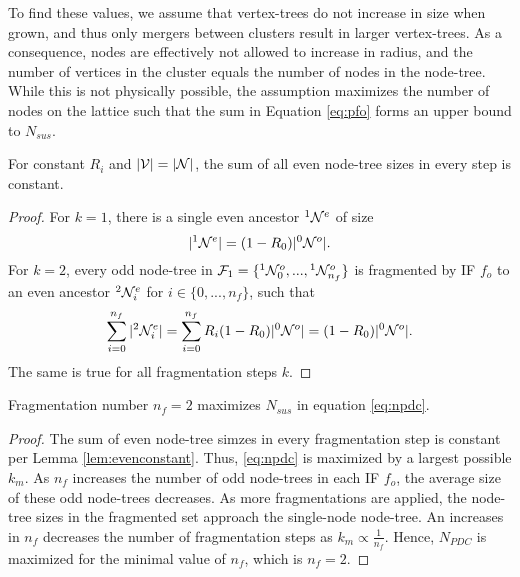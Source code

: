 To find these values, we assume that vertex-trees do not increase in size  when grown, and thus only mergers between clusters result in larger vertex-trees. As a consequence, nodes are effectively not allowed to increase in radius, and the number of vertices in the cluster equals the number of nodes in the node-tree. While this is not physically possible, the assumption maximizes the number of nodes on the lattice such that the sum in Equation \eqref{eq:pfo} forms an upper bound to $N_{sus}$.

\begin{lemma}\label{lem:evenconstant}
  For constant $R_i$ and $\lvert\mathcal{V}\rvert=\lvert\mathcal{N}\rvert$, the sum of all even node-tree sizes in every step is constant. 
\end{lemma}
\begin{proof}
  For $k=1$, there is a single even ancestor ${}^{1}\mathcal{N}^e$ of size 
  \begin{equation*}
    \lvert{}^{1}\mathcal{N}^e\rvert = (1 - R_0)\lvert{}^{0}\mathcal{N}^o\rvert.
  \end{equation*}
  For $k=2$, every odd node-tree in $\mathcal{F}_1=\{{}^{1}\mathcal{N}^o_0,...,{}^{1}\mathcal{N}^{o}_{n_f}\}$ is fragmented by IF $f_o$ to an even ancestor ${}^{2}\mathcal{N}^e_i$ for $i \in \{0,...,n_f \}$, such that 
  \begin{equation*}
    \sum_{i=0}^{n_f}{\lvert{}^{2}\mathcal{N}^e_i\rvert}  = \sum_{i=0}^{n_f}{R_i(1 - R_0)\lvert{}^{0}\mathcal{N}^o\rvert}= (1 - R_0)\lvert{}^{0}\mathcal{N}^o\rvert.
  \end{equation*}
  The same is true for all fragmentation steps $k$. 
\end{proof}

\begin{theorem}\label{the:fragnumber}
  Fragmentation number $n_f=2$ maximizes $N_{sus}$ in equation \eqref{eq:npdc}.
\end{theorem}
\begin{proof}
  The sum of even node-tree simzes in every fragmentation step is constant per Lemma \ref{lem:evenconstant}. Thus, \eqref{eq:npdc} is maximized by a largest possible $k_m$.  As $n_f$ increases the number of odd node-trees in each IF $f_o$, the average size of these odd node-trees decreases. As more fragmentations are applied, the node-tree sizes in the fragmented set approach the single-node node-tree. An increases in $n_f$ decreases the number of fragmentation steps as $ k_m \propto \frac{1}{n_f}$.  Hence, $N_{PDC}$ is maximized for the minimal value of $n_f$, which is $n_f = 2$.
\end{proof}


